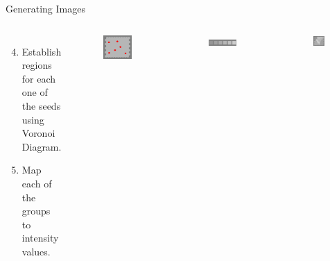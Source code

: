 \documentclass[10pt,xcolor=svgnames]{beamer} %
\begin{document}
\begin{frame}{Generating Images}
\begin{columns}
    \begin{enumerate}
        \setcounter{enumi}{3}
        \vspace{-0.5cm}
        \item Establish regions for each one of the seeds using Voronoi Diagram.
        \vspace{2cm}
        \item Map each of the groups to intensity values.
    \end{enumerate}
    \begin{figure}
        \centering
        \includegraphics[width=0.8\textwidth]{pictures/img3_cut0_seed_final.png}
    \end{figure}
    \vspace{-0.62cm}
    \begin{figure}
        \centering
        \includegraphics[width=0.8\textwidth]{pictures/intensities.png}
    \end{figure}
    \vspace{-0.6cm}
    \begin{figure}
        \centering
        \includegraphics[width=0.8\textwidth]{pictures/grid_init3.png}

\end{figure}
\end{columns}
\end{frame}
\end{document}
